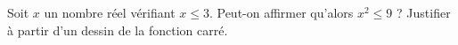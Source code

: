 
\begin{exercice}\label{exosmath-0254}

    Soit \( x\) un nombre réel vérifiant \( x\leq 3\). Peut-on affirmer qu'alors \( x^2\leq 9\) ? Justifier à partir d'un dessin de la fonction carré.

\end{exercice}
